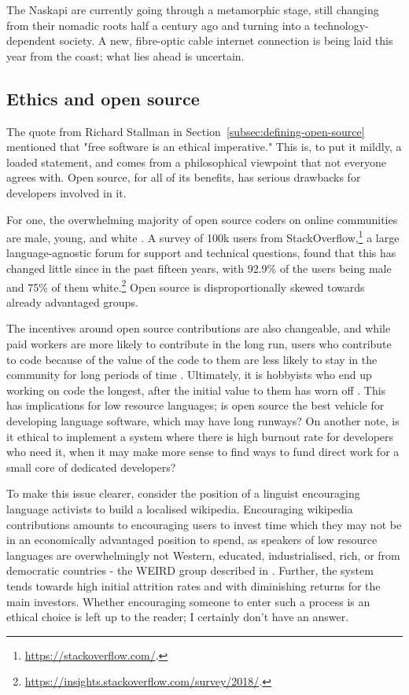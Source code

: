 The Naskapi are currently going through a metamorphic stage, still changing from their nomadic roots half a century ago and turning into a technology-dependent society. A new, fibre-optic cable internet connection is being laid this year from the coast; what lies ahead is uncertain.

\subsection{Ethics and open source}
\label{subsec:oss-ethics}

The quote from Richard Stallman in Section~\ref{subsec:defining-open-source} mentioned that "free software is an ethical imperative." This is, to put it mildly, a loaded statement, and comes from a philosophical viewpoint that not everyone agrees with. Open source, for all of its benefits, has serious drawbacks for developers involved in it.

For one, the overwhelming majority of open source coders on online communities are male, young, and white \citep{ghosh2002free}. A survey of 100k users from StackOverflow,\footnote{\href{https://stackoverflow.com/}{https://stackoverflow.com/}. } a large language-agnostic forum for support and technical questions, found that this has changed little since in the past fifteen years, with 92.9\% of the users being male and 75\% of them white.\footnote{\href{https://insights.stackoverflow.com/survey/2018/}{https://insights.stackoverflow.com/survey/2018/}. } Open source is disproportionally skewed towards already advantaged groups.

The incentives around open source contributions are also changeable, and while paid workers are more likely to contribute in the long run, users who contribute to code because of the value of the code to them are less likely to stay in the community for long periods of time \citep{roberts2006understanding, shah2006motivation}. Ultimately, it is hobbyists who end up working on code the longest, after the initial value to them has worn off \citep{shah2006motivation}. This has implications for low resource languages; is open source the best vehicle for developing language software, which may have long runways? On another note, is it ethical to implement a system where there is high burnout rate for developers who need it, when it may make more sense to find ways to fund direct work for a small core of dedicated developers?

To make this issue clearer, consider the position of a linguist encouraging language activists to build a localised wikipedia. Encouraging wikipedia contributions amounts to encouraging users to invest time which they may not be in an economically advantaged position to spend, as speakers of low resource languages are overwhelmingly not Western, educated, industrialised, rich, or from democratic countries - the WEIRD group described in \citet{henrich2010most}. Further, the system tends towards high initial attrition rates and with diminishing returns for the main investors. Whether encouraging someone to enter such a process is an ethical choice is left up to the reader; I certainly don't have an answer.

